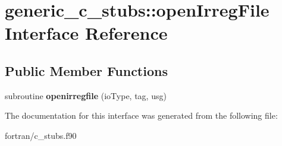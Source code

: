\hypertarget{interfacegeneric__c__stubs_1_1open_irreg_file}{}\section{generic\+\_\+c\+\_\+stubs\+:\+:open\+Irreg\+File Interface Reference}
\label{interfacegeneric__c__stubs_1_1open_irreg_file}
\subsection*{Public Member Functions}
\begin{DoxyCompactItemize}
\item 
\mbox{\label{interfacegeneric__c__stubs_1_1open_irreg_file_a6552860e53d4c23d33a89bb984edaddd}} 
subroutine {\bfseries openirregfile} (io\+Type, tag, usg)
\end{DoxyCompactItemize}


The documentation for this interface was generated from the following file\+:\begin{DoxyCompactItemize}
\item 
fortran/c\+\_\+stubs.\+f90\end{DoxyCompactItemize}
